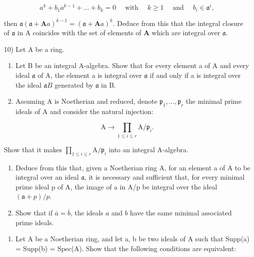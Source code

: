\[
a ^ {k} + b _ {1} a ^ {k - 1} + \dots + b _ {k} = 0 \quad \text { with } \quad k \geqslant 1 \quad \text { and } \quad b _ {i} \in \mathfrak {a} ^ {i},
\]

then \(\mathfrak{a}(\mathfrak{a} + \mathbf{A}a)^{k-1} = (\mathfrak{a} + \mathbf{A}a)^k\). Deduce from this that the integral closure of \(\mathfrak{a}\) in A coincides with the set of elements of \(\mathbf{A}\) which are integral over \(\mathfrak{a}\).

10) Let A be a ring.

\begin{enumerate}
\def\labelenumi{\alph{enumi})}
\item
  Let B be an integral A-algebra. Show that for every element a of A and every ideal \(\mathfrak{a}\) of A, the element a is integral over \(\mathfrak{a}\) if and only if a is integral over the ideal \(\mathfrak{a}B\) generated by \(\mathfrak{a}\) in B.
\item
  Assuming A is Noetherian and reduced, denote \(\mathfrak{p}_{1},\ldots,\mathfrak{p}_{r}\) the minimal prime ideals of A and consider the natural injection:
\end{enumerate}

\[
\mathrm{A} \rightarrow \prod_ {1 \leqslant i \leqslant r} \mathrm{A} / \mathfrak {p} _ {i}.
\]

Show that it makes \(\prod_{1\leqslant i\leqslant r}\mathrm{A} / \mathfrak{p}_i\) into an integral A-algebra.

\begin{enumerate}
\def\labelenumi{\alph{enumi})}
\setcounter{enumi}{2}
\item
  Deduce from this that, given a Noetherian ring A, for an element a of A to be integral over an ideal \(\mathfrak{a}\), it is necessary and sufficient that, for every minimal prime ideal p of A, the image of a in A/p be integral over the ideal \((\mathfrak{a} + p)/p\).
\item
  Show that if \(\overline{a} = \overline{b}\), the ideals \(a\) and \(b\) have the same minimal associated prime ideals.
\end{enumerate}

\begin{enumerate}
\def\labelenumi{\arabic{enumi})}
\setcounter{enumi}{10}
\tightlist
\item
  Let A be a Noetherian ring, and let a, b be two ideals of A such that Supp(a) = Supp(b) = Spec(A). Show that the following conditions are equivalent:
\end{enumerate}

